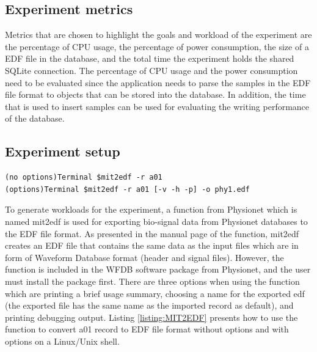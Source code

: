 \subsection{Experiment metrics}
Metrics that are chosen to highlight the goals and workload of the experiment are the percentage of CPU usage, the percentage of power consumption, the size of a EDF file in the database, and the total time the experiment holds the shared SQLite connection. The percentage of CPU usage and the power consumption need to be evaluated since the application needs to parse the samples in the EDF file format to objects that can be stored into the database. In addition, the time that is used to insert samples can be used for evaluating the writing performance of the database.
\subsection{Experiment setup}
\begin{lstlisting}[caption={Convert mit2edf by using terminal}, label = {listing:MIT2EDF}, captionpos=b]
(no options)Terminal $mit2edf -r a01 
(options)Terminal $mit2edf -r a01 [-v -h -p] -o phy1.edf
\end{lstlisting}
To generate workloads for the experiment, a function from Physionet which is named mit2edf is used for exporting bio-signal data from Physionet databases to the EDF file format. As presented in the manual page of the function, mit2edf creates an EDF file that contains the same data as the input files which are in form of Waveform Database format (header and signal files). However, the function is included in the WFDB software package from Physionet, and the user must install the package first. There are three options when using the function which are printing a brief usage summary, choosing a name for the exported edf (the exported file has the same name as the imported record as default), and printing debugging output. Listing \ref{listing:MIT2EDF} presents how to use the function to convert a01 record to EDF file format without options and with options on a Linux/Unix shell.
